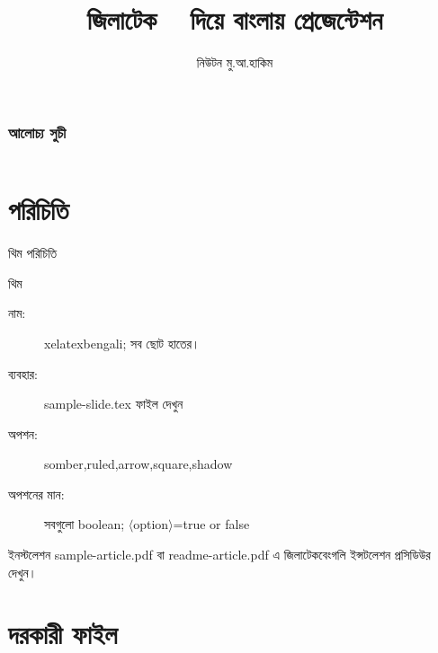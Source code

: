 \documentclass[xetex]{beamer}
\newcommand{\ignore}[1]{}
\begin{document}
\title[BeamerThemeXeLaTeXBengali]{জিলাটেক ‌ \XeLaTeX‌\ দিয়ে বাংলায় প্রেজেন্টেশন}
\author{নিউটন মু.আ.হাকিম}



\begin{frame}{}
   \titlepage
\end{frame}

\begin{frame}
	\frametitle{আলোচ্য সুচী}
	\begin{columns}
	\tableofcontents
	\end{columns}
\end{frame}

\section{পরিচিতি}
\begin{frame}{থিম পরিচিতি}
	\begin{block}{থিম}
	\begin{description}
		\item[নাম:] ‌{\rm xelatexbengali}; সব ছোট হাতের।
		\item[ব্যবহার:] {\rm sample-slide.tex} ফাইল দেখুন
		\item[অপশন:] {\rm somber,ruled,arrow,square,shadow}
		\item[অপশনের মান:] সবগুলো {\rm boolean; $\langle$option$\rangle$=true or false}
	\end{description}
	\end{block}
	\begin{block}{ইনস্টলেশন}
	sample-article.pdf বা readme-article.pdf এ জিলাটেকবেংগলি ইন্সটলেশন প্রসিডিউর দেখুন।
	\end{block}
\end{frame}

\section{দরকারী ফাইল}
\end{document}
